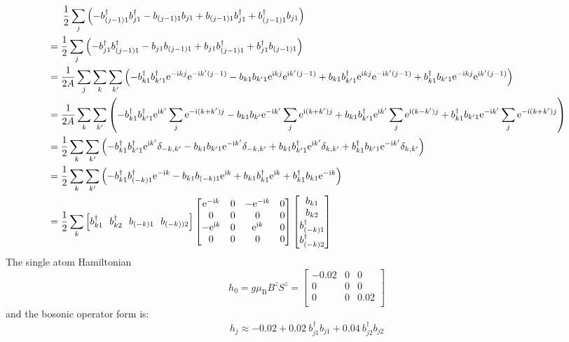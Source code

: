 \documentclass[letter]{article}
\newcommand{\e}{\mathrm{e}}
\newcommand{\ii}{\mathrm{i}}
\begin{document}
$$\begin{aligned}
    & \indent  \frac{1}{2}\sum_{j}\left(-b_{(j-1)1}^{\dagger}b_{j1}^{\dagger}-b_{(j-1)1}b_{j1}+b_{(j-1)1}b_{j1}^{\dagger}+b_{(j-1)1}^{\dagger}b_{j1}\right)\\
    &= \frac{1}{2}\sum_{j}\left(-b_{j1}^{\dagger}b_{(j-1)1}^{\dagger}-b_{j1}b_{(j-1)1}+b_{j1}b_{(j-1)1}^{\dagger}+b_{j1}^{\dagger}b_{(j-1)1}\right)\\
    &=\frac{1}{2A}\sum_{j}\sum_{k}\sum_{k'}\left(-b_{k1}^{\dagger}b_{k'1}^{\dagger}\e^{-\ii kj}\e^{-\ii k'(j-1)}-b_{k1}b_{k'1}\e^{\ii kj}\e^{\ii k'(j-1)}+b_{k1}b_{k'1}^{\dagger}\e^{\ii kj}\e^{-\ii k'(j-1)}+b_{k1}^{\dagger}b_{k'1}\e^{-\ii kj}\e^{\ii k'(j-1)}\right)\\
    &=\frac{1}{2A}\sum_{k}\sum_{k'}\left(-b_{k1}^{\dagger}b_{k'1}^{\dagger}\e^{\ii k'}\sum_j \e^{-\ii (k+k')j}-b_{k1}b_{k'}\e^{-\ii k'}\sum_j \e^{\ii (k+k')j}+b_{k1}b_{k'1}^{\dagger}\e^{\ii k'}\sum_j \e^{\ii (k-k')j}+b_{k1}^{\dagger}b_{k'1}\e^{-\ii k'}\sum_j \e^{-\ii (k+k')j}\right)\\
    &=\frac{1}{2}\sum_k\sum_{k'}\left(-b_{k1}^{\dagger}b_{k'1}^{\dagger}\e^{\ii k'}\delta_{-k,k'}-b_{k1}b_{k'1}\e^{-\ii k'}\delta_{-k,k'}+b_{k1}b_{k'1}^{\dagger}\e^{\ii k'}\delta_{k,k'}+b_{k1}^{\dagger}b_{k'1}\e^{-\ii k'}\delta_{k,k'}\right)\\
    &=\frac{1}{2}\sum_k\sum_{k'}\left(-b_{k1}^{\dagger}b_{(-k)1}^{\dagger}\e^{-\ii k}-b_{k1}b_{(-k)1}\e^{\ii k}+b_{k1}b_{k1}^{\dagger}\e^{\ii k}+b_{k1}^{\dagger}b_{k1}\e^{-\ii k}\right)\\
    &=\frac{1}{2}\sum_k \left[
      b_{k1}^{\dagger} \ \ 
      b_{k2}^{\dagger}\  \ 
      b_{(-k)1}\ \ 
      b_{(-k))2}\right]
     \begin{bmatrix}
          \e^{-\ii k} & 0 & -\e^{-\ii k} & 0 \\
         0 &  0 & 0 &0 \\
         -\e^{\ii k} &  0 & \e^{\ii k} &0\\
          0 & 0 & 0& 0
          \end{bmatrix}\begin{bmatrix}
              b_{k1}  \\
              b_{k2}  \\
              b_{(-k)1}^{\dagger}\\
              b_{(-k)2}^{\dagger}
              \end{bmatrix}
  \end{aligned}
  $$
The single atom Hamiltonian $$
h_0=g\mu_{\mathrm{B}} B^z S^z=\begin{bmatrix}
    -0.02 & 0 & 0 \\
   0 &  0 & 0  \\
  0 &  0 & 0.02 \\
    \end{bmatrix}
$$
and the bosonic operator form is:$$
h_{j}\approx-0.02+0.02\ b_{j1}^{\dagger}b_{j1}+0.04\ b_{j2}^{\dagger}b_{j2}
$$
\end{document}
